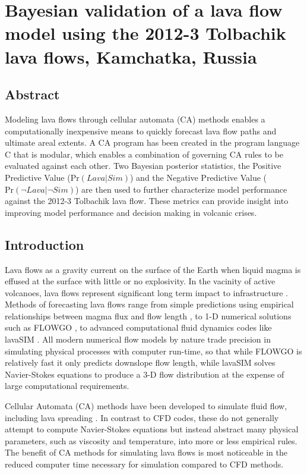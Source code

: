 \chapter{Bayesian validation of a lava flow model using the 2012-3 Tolbachik lava flows, Kamchatka, Russia}\label{ch_molasses}

\renewcommand*{\FigPath}{figures/chapter-molasses}

\section*{Abstract}
	Modeling lava flows through cellular automata (CA) methods enables a computationally inexpensive means to quickly forecast lava flow paths and ultimate areal extents. A CA program has been created in the program language C that is modular, which enables a combination of governing CA rules to be evaluated against each other. Two Bayesian posterior statistics, the Positive Predictive Value ($\text{Pr}(Lava|Sim)$) and the Negative Predictive Value ($\text{Pr}(\neg Lava|\neg Sim)$) are then used to further characterize model performance against the 2012-3 Tolbachik lava flow. These metrics can provide insight into improving model performance and decision making in volcanic crises. %

\section{Introduction}
	Lava flows as a gravity current on the surface of the Earth when liquid magma is effused at the surface with little or no explosivity. In the vacinity of active volcanoes, lava flows represent significant long term impact to infrastructure \citep{peterson2000lava}. Methods of forecasting lava flows range from simple predictions using empirical relationships between magma flux and flow length \citep{Glaze2003}, to 1-D numerical solutions such as FLOWGO \citep{harris2001flowgo}, to advanced computational fluid dynamics codes like lavaSIM \citep{hidaka2005vtfs}. All modern numerical flow models by nature trade precision in simulating physical processes with computer run-time, so that while FLOWGO is relatively fast it only predicts downslope flow length, while lavaSIM solves Navier-Stokes equations to produce a 3-D flow distribution at the expense of large computational requirements.
	
	Cellular Automata (CA) methods \citep{wolfram1984cellular} have been developed to simulate fluid flow, including lava spreading \citep{barca1994cellular}. In contrast to CFD codes, these do not generally attempt to compute Navier-Stokes equations but instead abstract many physical parameters, such as viscosity and temperature, into more or less empirical rules. The benefit of CA methods for simulating lava flows is most noticeable in the reduced computer time necessary for simulation compared to CFD methods.
	
